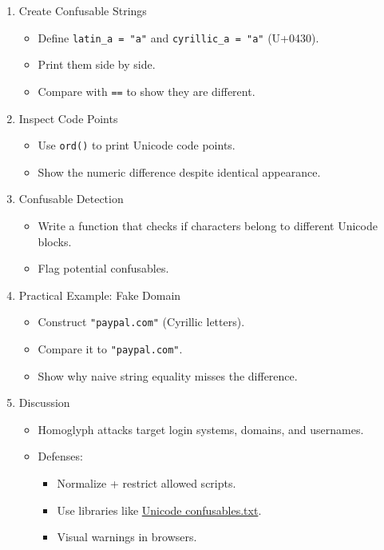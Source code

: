 \documentclass[
  letterpaper,
  DIV=11,
  numbers=noendperiod]{scrreprt}
\providecommand{\tightlist}{%
  \setlength{\itemsep}{0pt}\setlength{\parskip}{0pt}}
\begin{document}
\begin{enumerate}
\def\labelenumi{\arabic{enumi}.}
\item
  Create Confusable Strings

  \begin{itemize}
  \tightlist
  \item
    Define \texttt{latin\_a\ =\ "a"} and \texttt{cyrillic\_a\ =\ "а"}
    (U+0430).
  \item
    Print them side by side.
  \item
    Compare with \texttt{==} to show they are different.
  \end{itemize}
\item
  Inspect Code Points

  \begin{itemize}
  \tightlist
  \item
    Use \texttt{ord()} to print Unicode code points.
  \item
    Show the numeric difference despite identical appearance.
  \end{itemize}
\item
  Confusable Detection

  \begin{itemize}
  \tightlist
  \item
    Write a function that checks if characters belong to different
    Unicode blocks.
  \item
    Flag potential confusables.
  \end{itemize}
\item
  Practical Example: Fake Domain

  \begin{itemize}
  \tightlist
  \item
    Construct \texttt{"раураl.com"} (Cyrillic letters).
  \item
    Compare it to \texttt{"paypal.com"}.
  \item
    Show why naive string equality misses the difference.
  \end{itemize}
\item
  Discussion

  \begin{itemize}
  \item
    Homoglyph attacks target login systems, domains, and usernames.
  \item
    Defenses:

    \begin{itemize}
    \tightlist
    \item
      Normalize + restrict allowed scripts.
    \item
      Use libraries like
      \href{https://www.unicode.org/Public/security/latest/confusables.txt}{Unicode
      confusables.txt}.
    \item
      Visual warnings in browsers.
    \end{itemize}
  \end{itemize}
\end{enumerate}
\end{document}
